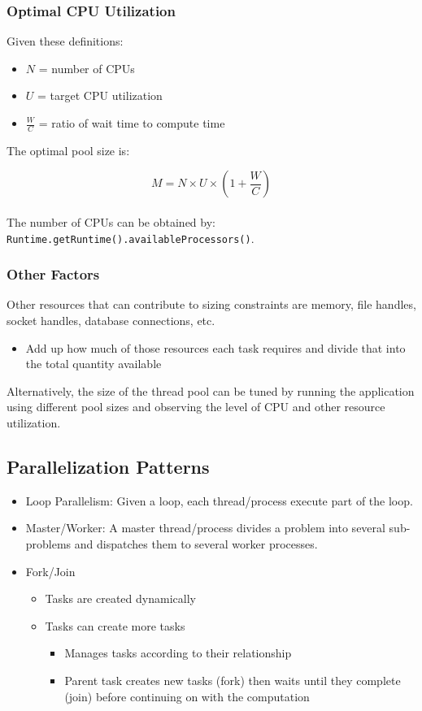 \documentclass[a4paper]{article}
\begin{document}
\subsubsection{Optimal CPU Utilization}
Given these definitions:
\begin{itemize}
	\item $N$ = number of CPUs
	\item $U$ = target CPU utilization
	\item $\frac{W}{C}$ = ratio of wait time to compute time
\end{itemize}
The optimal pool size is:

$$M = N \times U \times \left(1 + \frac{W}{C}\right)$$
\\
\noindent The number of CPUs can be obtained by: \texttt{Runtime.getRuntime().availableProcessors()}.
\subsubsection{Other Factors}
Other resources that can contribute to sizing constraints are memory, file handles, socket handles, database connections, etc.
\begin{itemize}
	\item Add up how much of those resources each task requires and divide that into the total quantity available
\end{itemize}
Alternatively, the size of the thread pool can be tuned by running the application using different pool sizes and observing the level of CPU and other resource utilization.
\subsection{Parallelization Patterns}
\begin{itemize}
	\item Loop Parallelism: Given a loop, each thread/process execute part of the loop.
	\item Master/Worker: A master thread/process divides a problem into several sub-problems and dispatches them to several worker processes.
	\item Fork/Join
	\begin{itemize}[label=$\circ$]
		\item Tasks are created dynamically
		\item Tasks can create more tasks
		\begin{itemize}[label=\tiny$\blacksquare$]
			\item Manages tasks according to their relationship
			\item Parent task creates new tasks (fork) then waits until they complete (join) before continuing on with the computation
		\end{itemize}
	\end{itemize}
\end{itemize}
\end{document}
